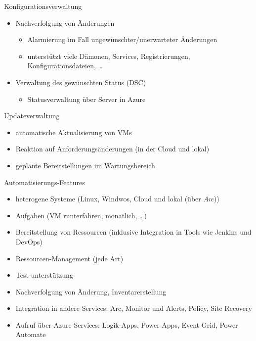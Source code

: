 \begin{flashcard}[]{Konfigurationsverwaltung}
  \begin{itemize}
    \item Nachverfolgung von Änderungen
      \begin{itemize}
        \item Alarmierung im Fall ungewünschter/unerwarteter Änderungen
        \item unterstützt viele Dämonen, Services, Registrierungen, Konfigurationsdateien, \ldots
      \end{itemize}
    \item Verwaltung des gewünschten Status (DSC)
      \begin{itemize}
        \item Statusverwaltung über Server in Azure
      \end{itemize}
  \end{itemize}
\end{flashcard}

\begin{flashcard}[]{Updateverwaltung}
  \begin{itemize}
    \item automatische Aktualisierung von VMs
    \item Reaktion auf Anforderungsänderungen (in der Cloud und lokal)
    \item geplante Bereitstellungen im Wartungsbereich
  \end{itemize}
\end{flashcard}

\begin{flashcard}[]{Automatisierungs-Features}
  \begin{itemize}
    \item heterogene Systeme (Linux, Windwos, Cloud und lokal (über \emph{Arc}))
    \item Aufgaben (VM runterfahren, monatlich, \ldots)
    \item Bereitstellung von Ressourcen (inklusive Integration in Tools wie Jenkins und DevOps)
    \item Ressourcen-Management (jede Art)
    \item Test-unterstützung
    \item Nachverfolgung von Änderung, Inventarerstellung
    \item Integration in andere Services:\newline
      Arc, Monitor und Alerts, Policy, Site Recovery
    \item Aufruf über Azure Services:\newline
      Logik-Apps, Power Apps, Event Grid, Power Automate
  \end{itemize}
\end{flashcard}


